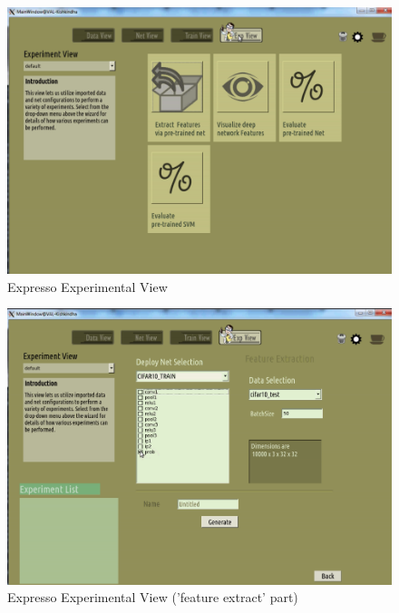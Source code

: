 \begin{figure}[!ht]
\center
    \includegraphics[scale=0.9]{images_expresso/09_exp.png}
    \caption{Expresso Experimental View}
\end{figure}

\begin{figure}[!ht]
\center
    \includegraphics[scale=0.9]{images_expresso/10_exp_feature_extract.png}
    \caption{Expresso Experimental View ('feature extract' part)}
\end{figure}

